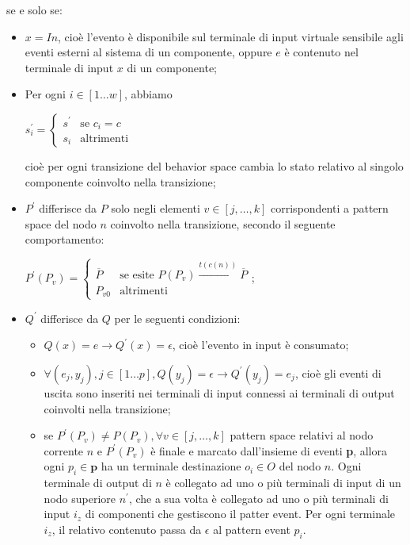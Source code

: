 \begin{defn}
\begin{enumerate}
se e solo se:
\begin{itemize}
\item $x = In$, cioè l'evento è disponibile sul terminale di input virtuale sensibile agli eventi esterni al sistema di un componente, oppure $e$ è contenuto nel terminale di input $x$ di un componente;
\item Per ogni $i \in [1 \ldots w]$, abbiamo
\begin{center}
$s^\prime_i = \begin{cases} s^\prime & \mbox{se }c_i = c\\ s_i & \mbox{altrimenti} \end{cases}$
\end{center}
cioè per ogni transizione del behavior space cambia lo stato relativo al singolo componente coinvolto nella transizione;
\item $P^\prime$ differisce da $P$ solo negli elementi $v \in [j, \ldots, k]$ corrispondenti a pattern space del nodo $n$ coinvolto nella transizione, secondo il seguente comportamento:
\begin{center}
$P^\prime(P_v) = \begin{cases} \overline{P} & \mbox{se esite } P(P_v) \xrightarrow{t(c(n))} \overline{P}\\ P_{v0} & \mbox{altrimenti} \end{cases}$;
\end{center}
\item $Q^\prime$ differisce da $Q$ per le seguenti condizioni:
\begin{itemize}
\item $Q(x) = e \rightarrow Q^\prime(x) = \epsilon$, cioè l'evento in input è consumato;
\item $\forall(e_j,y_j), j \in [1 \ldots p], Q(y_j) = \epsilon \rightarrow Q^\prime(y_j) = e_j$, cioè gli eventi di uscita sono inseriti nei terminali di input connessi ai terminali di output coinvolti nella transizione;
\item se $P^\prime(P_v) \neq P(P_v), \forall v \in [j, \ldots, k]$ pattern space relativi al nodo corrente $n$ e $P^\prime(P_v)$ è finale e marcato dall'insieme di eventi \textbf{p}, allora ogni $p_i \in \textbf{p}$  ha un terminale destinazione $o_i \in O$ del nodo $n$. Ogni terminale di output di $n$ è collegato ad uno o più terminali di input di un nodo superiore $n^\prime$, che a sua volta è collegato ad uno o più terminali di input $i_z$ di componenti che gestiscono il patter event. Per ogni terminale $i_z$, il relativo contenuto passa da $\epsilon$ al pattern event $p_i$.
\end{itemize}
\end{itemize}
\end{enumerate}
\end{defn}

